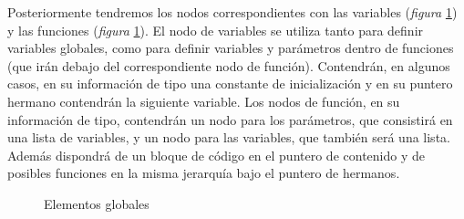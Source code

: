 \documentclass[a4paper,10pt]{article}
\begin{document}
Posteriormente tendremos los nodos correspondientes con las variables (\emph{figura} \ref{fig:funvar}) y las funciones (\emph{figura} \ref{fig:funvar}). El nodo de variables se utiliza tanto para definir variables globales, como para definir variables y parámetros dentro de funciones (que irán debajo del correspondiente nodo de función). Contendrán, en algunos casos, en su información de tipo una constante de inicialización y en su puntero hermano contendrán la siguiente variable. Los nodos de función, en su información de tipo, contendrán un nodo para los parámetros, que consistirá en una lista de variables, y un nodo para las variables, que también será una lista. Además dispondrá de un bloque de código en el puntero de contenido y de posibles funciones en la misma jerarquía bajo el puntero de hermanos.
\begin{figure}[H]
  \centering
  \hspace{11mm}
  \caption{Elementos globales}
  \label{fig:funvar}
\end{figure}
\end{document}
